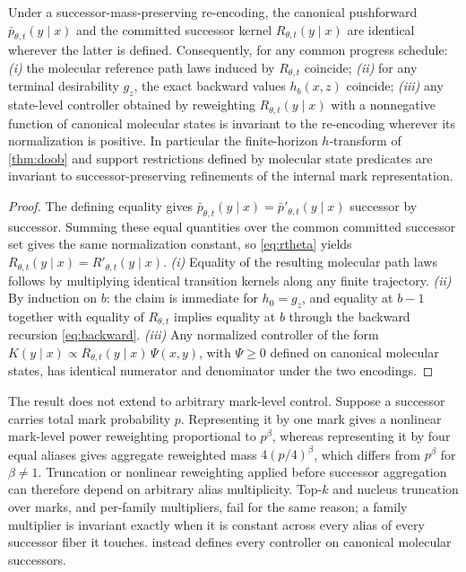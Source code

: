 \begin{proposition}
\label{prop:encoding}
Under a successor-mass-preserving re-encoding, the canonical pushforward $\bar p_{\theta,t}(y\mid x)$ and the committed successor kernel $R_{\theta,t}(y\mid x)$ are identical wherever the latter is defined. Consequently, for any common progress schedule:
\emph{(i)} the molecular reference path laws induced by $R_{\theta,t}$ coincide;
\emph{(ii)} for any terminal desirability $g_z$, the exact backward values $h_b(x,z)$ coincide;
\emph{(iii)} any state-level controller obtained by reweighting $R_{\theta,t}(y\mid x)$ with a nonnegative function of canonical molecular states is invariant to the re-encoding wherever its normalization is positive.
In particular the finite-horizon $h$-transform of \cref{thm:doob} and support restrictions defined by molecular state predicates are invariant to successor-preserving refinements of the internal mark representation.
\end{proposition}

\begin{proof}
The defining equality gives $\bar p_{\theta,t}(y\mid x)=\bar p'_{\theta,t}(y\mid x)$ successor by successor. Summing these equal quantities over the common committed successor set gives the same normalization constant, so \eqref{eq:rtheta} yields $R_{\theta,t}(y\mid x)=R'_{\theta,t}(y\mid x)$.
\emph{(i)} Equality of the resulting molecular path laws follows by multiplying identical transition kernels along any finite trajectory.
\emph{(ii)} By induction on $b$: the claim is immediate for $h_0=g_z$, and equality at $b-1$ together with equality of $R_{\theta,t}$ implies equality at $b$ through the backward recursion \eqref{eq:backward}.
\emph{(iii)} Any normalized controller of the form $K(y\mid x)\propto R_{\theta,t}(y\mid x)\,\Psi(x,y)$, with $\Psi\ge0$ defined on canonical molecular states, has identical numerator and denominator under the two encodings.
\end{proof}

\begin{remark}
The result does not extend to arbitrary mark-level control. Suppose a successor carries total mark probability $p$. Representing it by one mark gives a nonlinear mark-level power reweighting proportional to $p^{\beta}$, whereas representing it by four equal aliases gives aggregate reweighted mass $4(p/4)^{\beta}$, which differs from $p^{\beta}$ for $\beta\neq1$. Truncation or nonlinear reweighting applied before successor aggregation can therefore depend on arbitrary alias multiplicity. Top-$k$ and nucleus truncation over marks, and per-family multipliers, fail for the same reason; a family multiplier is invariant exactly when it is constant across every alias of every successor fiber it touches. \method{} instead defines every controller on canonical molecular successors.
\end{remark}

